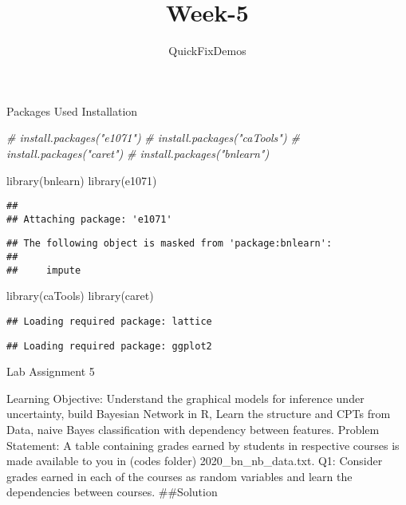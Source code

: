 \documentclass[
]{article}
\title{Week-5}
\author{QuickFixDemos}
\date{}
\newenvironment{Shaded}{\begin{snugshade}}{\end{snugshade}}
\newcommand{\CommentTok}[1]{\textcolor[rgb]{0.56,0.35,0.01}{\textit{#1}}}
\newcommand{\FunctionTok}[1]{\textcolor[rgb]{0.00,0.00,0.00}{#1}}
\newcommand{\NormalTok}[1]{#1}
\begin{document}
\maketitle

Packages Used Installation

\begin{Shaded}
\begin{Highlighting}[]
\CommentTok{\# install.packages("e1071") }
\CommentTok{\# install.packages("caTools") }
\CommentTok{\# install.packages("caret") }
\CommentTok{\# install.packages("bnlearn")}
\end{Highlighting}
\end{Shaded}

\begin{Shaded}
\begin{Highlighting}[]
\FunctionTok{library}\NormalTok{(bnlearn)}
\FunctionTok{library}\NormalTok{(e1071) }
\end{Highlighting}
\end{Shaded}

\begin{verbatim}
## 
## Attaching package: 'e1071'
\end{verbatim}

\begin{verbatim}
## The following object is masked from 'package:bnlearn':
## 
##     impute
\end{verbatim}

\begin{Shaded}
\begin{Highlighting}[]
\FunctionTok{library}\NormalTok{(caTools) }
\FunctionTok{library}\NormalTok{(caret) }
\end{Highlighting}
\end{Shaded}

\begin{verbatim}
## Loading required package: lattice
\end{verbatim}

\begin{verbatim}
## Loading required package: ggplot2
\end{verbatim}

Lab Assignment 5

Learning Objective: Understand the graphical models for inference under
uncertainty, build Bayesian Network in R, Learn the structure and CPTs
from Data, naive Bayes classification with dependency between features.
Problem Statement: A table containing grades earned by students in
respective courses is made available to you in (codes folder)
2020\_bn\_nb\_data.txt. Q1: Consider grades earned in each of the
courses as random variables and learn the dependencies between courses.
\#\#Solution
\end{document}
